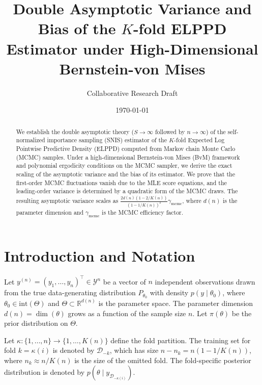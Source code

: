 \documentclass[12pt]{article}
\begin{document}
\title{Double Asymptotic Variance and Bias of the $K$-fold ELPPD Estimator under High-Dimensional Bernstein-von Mises}
\author{Collaborative Research Draft}
\date{\today}
\maketitle

\begin{abstract}
We establish the double asymptotic theory ($S \to \infty$ followed by $n \to \infty$) of the self-normalized importance sampling (SNIS) estimator of the $K$-fold Expected Log Pointwise Predictive Density (ELPPD) computed from Markov chain Monte Carlo (MCMC) samples. Under a high-dimensional Bernstein-von Mises (BvM) framework and polynomial ergodicity conditions on the MCMC sampler, we derive the exact scaling of the asymptotic variance and the bias of its estimator. We prove that the first-order MCMC fluctuations vanish due to the MLE score equations, and the leading-order variance is determined by a quadratic form of the MCMC draws. The resulting asymptotic variance scales as $\frac{2 d(n)(1 - 2/K(n))}{(1 - 1/K(n))^2} \gamma_{\mathrm{mcmc}}$, where $d(n)$ is the parameter dimension and $\gamma_{\mathrm{mcmc}}$ is the MCMC efficiency factor.
\end{abstract}

\section{Introduction and Notation}
Let $y^{(n)} = (y_1, \dots, y_n)^\top \in \mathcal{Y}^n$ be a vector of $n$ independent observations drawn from the true data-generating distribution $P_{\theta_0}$ with density $p(y \mid \theta_0)$, where $\theta_0 \in \text{int}(\Theta)$ and $\Theta \subset \mathbb{R}^{d(n)}$ is the parameter space. The parameter dimension $d(n) = \dim(\theta)$ grows as a function of the sample size $n$. Let $\pi(\theta)$ be the prior distribution on $\Theta$.

Let $\kappa: \{1, \dots, n\} \to \{1, \dots, K(n)\}$ define the fold partition. The training set for fold $k = \kappa(i)$ is denoted by $\mathcal{D}_{-k}$, which has size $n - n_k = n(1 - 1/K(n))$, where $n_k \approx n/K(n)$ is the size of the omitted fold. The fold-specific posterior distribution is denoted by $p(\theta \mid y_{\mathcal{D}_{-\kappa(i)}})$.
\end{document}
